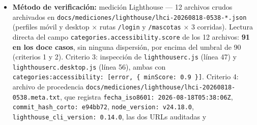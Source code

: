 \documentclass[
  spanish,
]{article}
\providecommand{\tightlist}{%
  \setlength{\itemsep}{0pt}\setlength{\parskip}{0pt}}
\begin{document}
\begin{itemize}
  \begin{enumerate}
  \def\labelenumi{\arabic{enumi}.}
  \tightlist
  \item
    En las corridas Lighthouse sobre la ruta \texttt{/\allowbreak{}login}, la
    puntuación de Accessibility es ≥ 90 en perfil móvil y en perfil de
    escritorio.
  \item
    En las corridas Lighthouse sobre la ruta \texttt{/\allowbreak{}mascotas} (vista
    autenticada), la puntuación de Accessibility es ≥ 90 en ambos
    perfiles.
  \item
    El umbral de 0,90 está declarado a nivel \texttt{error} en las dos
    configuraciones de medición (perfil móvil y perfil de escritorio),
    de modo que una regresión por debajo de 90 haga fallar la
    comprobación.
  \item
    Los archivos crudos de las corridas quedan archivados en el
    repositorio junto con un registro de procedencia que indique fecha,
    commit auditado, versiones de herramienta, URLs y perfiles.
  \end{enumerate}
\item
  \textbf{Método de verificación:} medición Lighthouse --- 12 archivos
  crudos archivados en
  \texttt{docs/\allowbreak{}mediciones/\allowbreak{}lighthouse/\allowbreak{}lhci-\allowbreak{}20260818-\allowbreak{}0538-*.\allowbreak{}json}
  (perfiles móvil y desktop × rutas \texttt{/\allowbreak{}login} y \texttt{/\allowbreak{}mascotas}
  × 3 corridas). Lectura directa del campo
  \texttt{categories.\allowbreak{}accessibility.\allowbreak{}score} de los 12 archivos: \textbf{91
  en los doce casos}, sin ninguna dispersión, por encima del umbral de
  90 (criterios 1 y 2). Criterio 3: inspección de
  \texttt{lighthouserc.\allowbreak{}js} (línea 47) y \texttt{lighthouserc.\allowbreak{}desktop.\allowbreak{}js}
  (línea 56), ambas con
  \texttt{\textquotesingle{}categories:acc\allowbreak{}essibility\textquotesingle{}:\ {[}\textquotesingle{}\allowbreak{}error\textquotesingle{},\allowbreak{}\ \{\ min\allowbreak{}Score:\ 0.\allowbreak{}9\ \}{]}}.
  Criterio 4: archivo de procedencia
  \texttt{docs/\allowbreak{}mediciones/\allowbreak{}lighthouse/\allowbreak{}lhci-\allowbreak{}20260818-\allowbreak{}0538.\allowbreak{}meta.\allowbreak{}txt}, que
  registra \texttt{fecha\_\allowbreak{}iso8601:\ 202\allowbreak{}6-\allowbreak{}08-\allowbreak{}18\allowbreak{}T05:38:06\allowbreak{}Z},
  \texttt{commit\_\allowbreak{}hash\_\allowbreak{}corto:\ e\allowbreak{}94bb72},
  \texttt{node\_\allowbreak{}version:\ v24.\allowbreak{}18.\allowbreak{}0},
  \texttt{lighthouse\_\allowbreak{}cli\_\allowbreak{}ver\allowbreak{}sion:\ 0.\allowbreak{}14.\allowbreak{}0}, las dos URLs auditadas y

\end{itemize}
\end{document}

